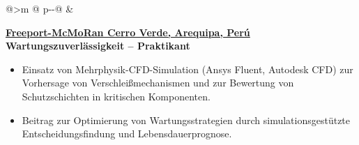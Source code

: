 \begin{tabular}{@{}>{\raggedleft\arraybackslash}m{\datecol} @{\hspace{\colgap}} p{\dimexpr\textwidth-\datecol-\colgap\relax}@{}}
 &
\begin{minipage}[t]{\linewidth}\vspace{0pt}
\begin{expblock}
  \footnotesize
  \setlength{\parindent}{0pt}\setlength{\parskip}{0pt}
    \textbf{\href{https://www.fcx.com}{Freeport-McMoRan Cerro Verde, Arequipa, Perú}}\\[-0.1em]
  \textbf{Wartungszuverlässigkeit – Praktikant}\\[-1em]
  \begin{itemize}[nosep,leftmargin=1em]
    \item Einsatz von Mehrphysik-CFD-Simulation (Ansys Fluent, Autodesk CFD) zur Vorhersage von Verschleißmechanismen und zur Bewertung von Schutzschichten in kritischen Komponenten.  
    \item Beitrag zur Optimierung von Wartungsstrategien durch simulationsgestützte Entscheidungsfindung und Lebensdauerprognose.  
  \end{itemize}
\end{expblock}
\end{minipage}

\end{tabular}